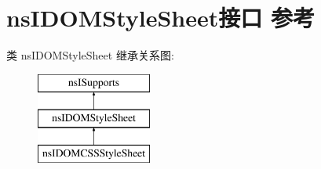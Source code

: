 \hypertarget{interfacens_i_d_o_m_style_sheet}{}\section{ns\+I\+D\+O\+M\+Style\+Sheet接口 参考}
\label{interfacens_i_d_o_m_style_sheet}
类 ns\+I\+D\+O\+M\+Style\+Sheet 继承关系图\+:\begin{figure}[H]
\begin{center}
\leavevmode
\includegraphics[height=3.000000cm]{interfacens_i_d_o_m_style_sheet}
\end{center}
\end{figure}
